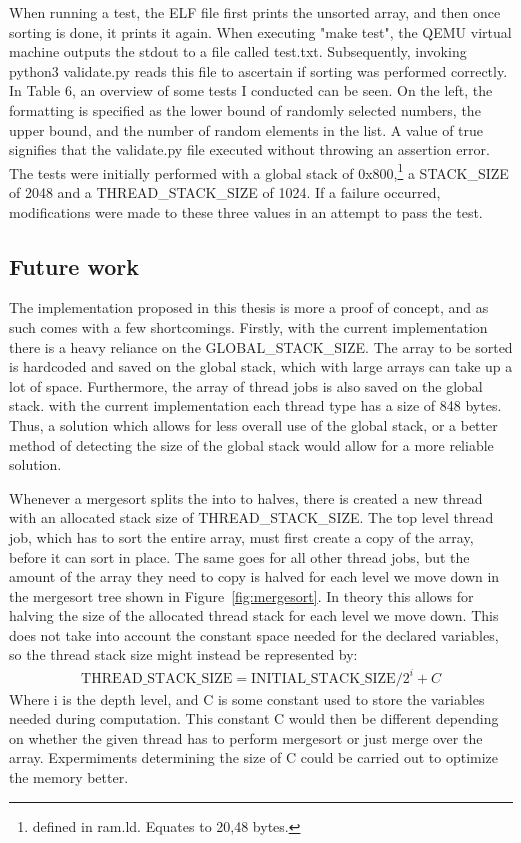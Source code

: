 When running a test, the ELF file first prints the unsorted array, and then once
sorting is done, it prints it again. When executing "make test", the QEMU
virtual machine outputs the stdout to a file called test.txt. Subsequently,
invoking python3 validate.py reads this file to ascertain if sorting was
performed correctly. In Table 6, an overview of some tests I conducted can be
seen. On the left, the formatting is specified as the lower bound of randomly
selected numbers, the upper bound, and the number of random elements in the
list. A value of true signifies that the validate.py file executed without
throwing an assertion error. The tests were initially performed with a global
stack of 0x800,\footnote{defined in ram.ld. Equates to 20,48 bytes.} a
STACK\_SIZE of 2048 and a THREAD\_STACK\_SIZE of 1024. If a failure occurred,
modifications were made to these three values in an attempt to pass the test.

\subsection{Future work}
The implementation proposed in this thesis is more a proof of concept, and as
such comes with a few shortcomings. Firstly, with the current implementation
there is a heavy reliance on the GLOBAL\_STACK\_SIZE. The array to be sorted is
hardcoded and saved on the global stack, which with large arrays can take up a
lot of space. Furthermore, the array of thread jobs is also saved on the global
stack. with the current implementation each thread type has a size of 848 bytes.
Thus, a solution which allows for less overall use of the global stack, or a
better method of detecting the size of the global stack would allow for a more
reliable solution.

Whenever a mergesort splits the into to halves, there is created a new thread
with an allocated stack size of THREAD\_STACK\_SIZE. The top level thread job,
which has to sort the entire array, must first create a copy of the array, before
it can sort in place. The same goes for all other thread jobs, but the amount of
the array they need to copy is halved for each level we move down in the
mergesort tree shown in Figure~\ref{fig:mergesort}. In theory this allows for
halving the size of the allocated thread stack for each level we move down. This
does not take into account the constant space needed for the declared variables,
so the thread stack size might instead be represented by:
\begin{align}
  \text{THREAD\_STACK\_SIZE} = \text{INITIAL\_STACK\_SIZE} / 2^i + C
\end{align}
Where i is the depth level, and C is some constant used to store the variables
needed during computation. This constant C would then be different depending on
whether the given thread has to perform mergesort or just merge over the array.
Expermiments determining the size of C could be carried out to optimize the
memory better.

